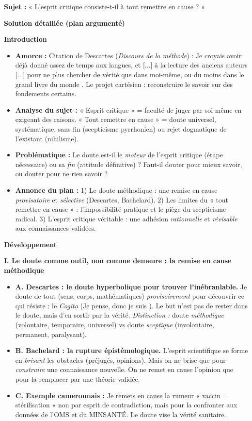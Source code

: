 \documentclass[11pt]{article}
\begin{document}
\begin{exoresolu}
\textbf{Sujet :} « L'esprit critique consiste-t-il à tout remettre en cause ? »

\textbf{Solution détaillée (plan argumenté)}

\textbf{Introduction}
\begin{itemize}
    \item \textbf{Amorce :} Citation de Descartes (\emph{Discours de la méthode}) : \guillemotleft Je croyais avoir déjà donné assez de temps aux langues, et [...] à la lecture des anciens auteurs [...] pour ne plus chercher de vérité que dans moi-même, ou du moins dans le grand livre du monde \guillemotright. Le projet cartésien : reconstruire le savoir sur des fondements certains.
    \item \textbf{Analyse du sujet :} « Esprit critique » = faculté de juger par soi-même en exigeant des raisons. « Tout remettre en cause » = doute universel, systématique, sans fin (scepticisme pyrrhonien) ou rejet dogmatique de l'existant (nihilisme).
    \item \textbf{Problématique :} Le doute est-il le \emph{moteur} de l'esprit critique (étape nécessaire) ou sa \emph{fin} (attitude définitive) ? Faut-il douter pour mieux savoir, ou douter pour ne rien savoir ?
    \item \textbf{Annonce du plan :} 1) Le doute méthodique : une remise en cause \emph{provisatoire} et \emph{sélective} (Descartes, Bachelard). 2) Les limites du « tout remettre en cause » : l'impossibilité pratique et le piège du scepticisme radical. 3) L'esprit critique véritable : une adhésion \emph{rationnelle} et \emph{révisable} aux connaissances validées.
\end{itemize}

\textbf{Développement}

\textbf{I. Le doute comme outil, non comme demeure : la remise en cause méthodique}
\begin{itemize}
    \item \textbf{A. Descartes : le doute hyperbolique pour trouver l'inébranlable.} Je doute de tout (sens, corps, mathématiques) \emph{provisoirement} pour découvrir ce qui résiste : le \emph{Cogito} (\guillemotleft Je pense, donc je suis \guillemotright). Le but n'est pas de rester dans le doute, mais d'en sortir par la vérité. \emph{Distinction :} doute \emph{méthodique} (volontaire, temporaire, universel) vs doute \emph{sceptique} (involontaire, permanent, paralysant).
    \item \textbf{B. Bachelard : la rupture épistémologique.} L'esprit scientifique se forme en \emph{brisant} les obstacles (préjugés, opinions). Mais on ne brise que pour \emph{construire} une connaissance nouvelle. On ne remet en cause l'opinion que pour la remplacer par une théorie validée.
    \item \textbf{C. Exemple camerounais :} Je remets en cause la rumeur « vaccin = stérilisation » non par esprit de contradiction, mais pour la confronter aux données de l'OMS et du MINSANTÉ. Le doute vise la vérité sanitaire.
\end{itemize}


\end{exoresolu}
\end{document}
